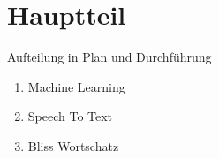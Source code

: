 \chapter{Hauptteil}

Aufteilung in Plan und Durchführung \par

\begin{enumerate}
	
	\item Machine Learning
	
	\item Speech To Text
	
	\item Bliss Wortschatz

\end{enumerate}